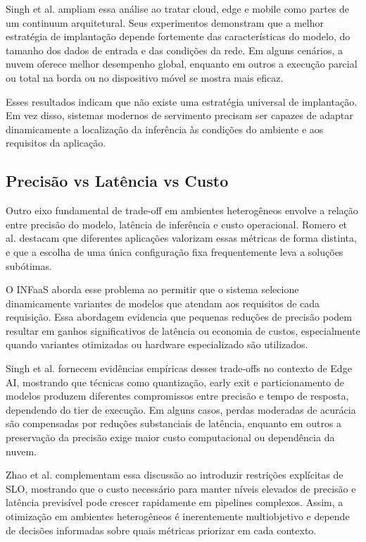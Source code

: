 Singh et al. ampliam essa análise ao tratar cloud, edge e mobile como partes de um continuum arquitetural. Seus experimentos demonstram que a melhor estratégia de implantação depende fortemente das características do modelo, do tamanho dos dados de entrada e das condições da rede. Em alguns cenários, a nuvem oferece melhor desempenho global, enquanto em outros a execução parcial ou total na borda ou no dispositivo móvel se mostra mais eficaz.

Esses resultados indicam que não existe uma estratégia universal de implantação. Em vez disso, sistemas modernos de servimento precisam ser capazes de adaptar dinamicamente a localização da inferência às condições do ambiente e aos requisitos da aplicação.
\subsection{Precisão vs Latência vs Custo}
Outro eixo fundamental de trade-off em ambientes heterogêneos envolve a relação entre precisão do modelo, latência de inferência e custo operacional. Romero et al. destacam que diferentes aplicações valorizam essas métricas de forma distinta, e que a escolha de uma única configuração fixa frequentemente leva a soluções subótimas.

O INFaaS aborda esse problema ao permitir que o sistema selecione dinamicamente variantes de modelos que atendam aos requisitos de cada requisição. Essa abordagem evidencia que pequenas reduções de precisão podem resultar em ganhos significativos de latência ou economia de custos, especialmente quando variantes otimizadas ou hardware especializado são utilizados.

Singh et al. fornecem evidências empíricas desses trade-offs no contexto de Edge AI, mostrando que técnicas como quantização, early exit e particionamento de modelos produzem diferentes compromissos entre precisão e tempo de resposta, dependendo do tier de execução. Em alguns casos, perdas moderadas de acurácia são compensadas por reduções substanciais de latência, enquanto em outros a preservação da precisão exige maior custo computacional ou dependência da nuvem.

Zhao et al. complementam essa discussão ao introduzir restrições explícitas de SLO, mostrando que o custo necessário para manter níveis elevados de precisão e latência previsível pode crescer rapidamente em pipelines complexos. Assim, a otimização em ambientes heterogêneos é inerentemente multiobjetivo e depende de decisões informadas sobre quais métricas priorizar em cada contexto.
